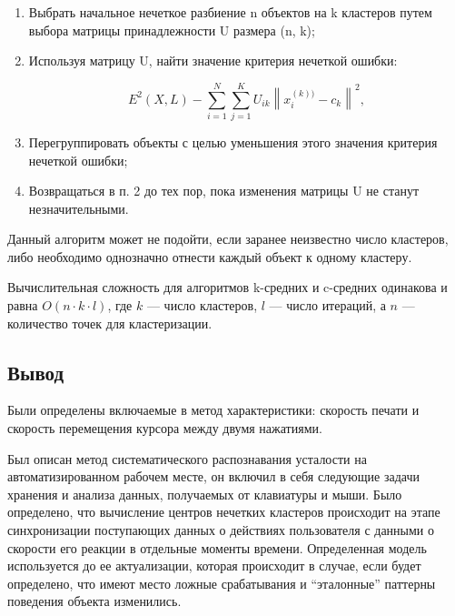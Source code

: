 \begin{enumerate}[leftmargin=1.6\parindent]
\item Выбрать начальное нечеткое разбиение n объектов на k кластеров путем выбора матрицы принадлежности U размера (n, k);
\item Используя матрицу U, найти значение критерия нечеткой ошибки:

\begin{equation}
\label{eq:e22}
E^2(X,L)-\sum_{i=1}^N\sum_{j=1}^KU_{ik}\left \|x_i^{(k))}-c_k  \right \|^2,
\end{equation}
\item Перегруппировать объекты с целью уменьшения этого значения критерия нечеткой ошибки;
\item Возвращаться в п. 2 до тех пор, пока изменения матрицы U не станут незначительными.
\end{enumerate}

Данный алгоритм может не подойти, если заранее неизвестно число кластеров, либо необходимо однозначно отнести каждый объект к одному кластеру. \cite{clasters}

Вычислительная сложность для алгоритмов k-средних и c-средних одинакова и равна $O(n \cdot k \cdot l)$, где $k$ --- число кластеров, $l$ --- число итераций, а $n$ --- количество точек для кластеризации. \cite{clasters}


\subsection*{Вывод}
Были определены включаемые в метод характеристики: скорость печати и скорость перемещения курсора между двумя нажатиями.

Был описан метод систематического распознавания усталости на автоматизированном рабочем месте, он включил в себя следующие задачи хранения и анализа данных, получаемых от клавиатуры и мыши. Было определено, что вычисление центров нечетких кластеров происходит на этапе синхронизации поступающих данных о действиях пользователя с данными о скорости его реакции в отдельные моменты времени. Определенная модель используется до ее актуализации, которая происходит в случае, если будет определено, что имеют место ложные срабатывания и ``эталонные'' паттерны поведения объекта изменились.

